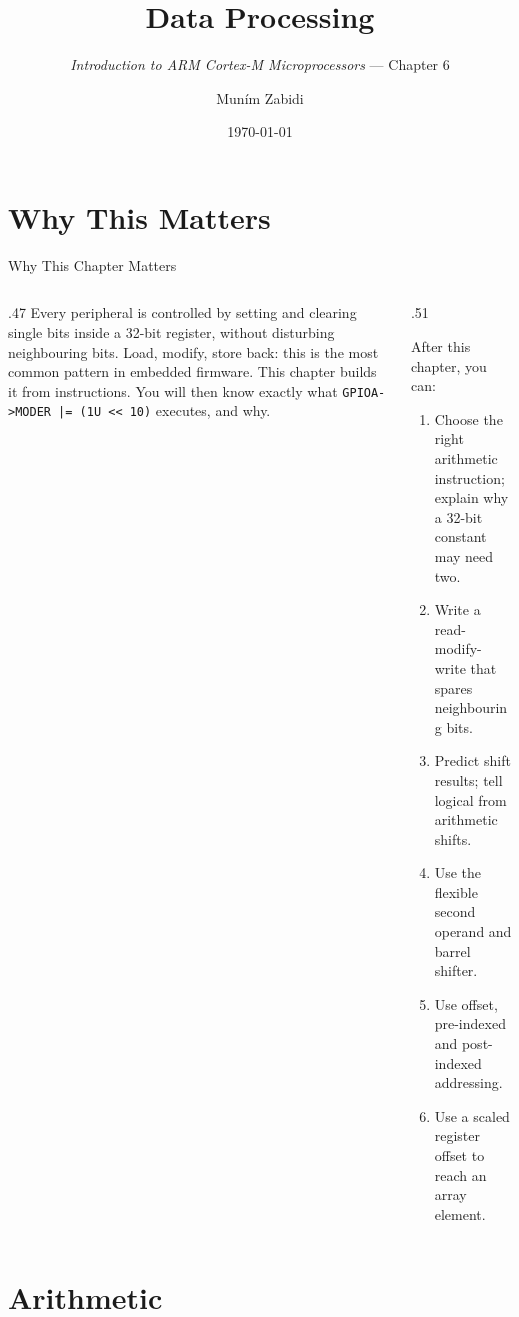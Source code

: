 \documentclass[9pt,aspectratio=169,xcolor=table]{beamer}
\title{Data Processing}
\subtitle{\emph{Introduction to ARM Cortex-M Microprocessors} --- Chapter 6}
\author{Mun\'{i}m Zabidi}
\institute{\color{primary}Faculty of Electrical Engineering, Universiti Teknologi Malaysia}
\date{\today}
\begin{document}
\titlepage

\section{Why This Matters}

\begin{frame}[fragile]{Why This Chapter Matters}
    \begin{columns}[T]
    \begin{column}{.47\textwidth}
        {\normalsize Every peripheral is controlled by setting and clearing single bits inside a 32-bit register, without disturbing neighbouring bits. Load, modify, store back: this is the most common pattern in embedded firmware. This chapter builds it from instructions. You will then know exactly what \verb+GPIOA->MODER |= (1U << 10)+ executes, and why.}
    \end{column}
    \begin{column}{.51\textwidth}
        \begin{block}{After this chapter, you can:}
        {\small
        \begin{enumerate}\itemsep2pt
            \item Choose the right arithmetic instruction; explain why a 32-bit constant may need two.
            \item Write a read-modify-write that spares neighbouring bits.
            \item Predict shift results; tell logical from arithmetic shifts.
            \item Use the flexible second operand and barrel shifter.
            \item Use offset, pre-indexed and post-indexed addressing.
            \item Use a scaled register offset to reach an array element.
        \end{enumerate}}
        \end{block}
    \end{column}
    \end{columns}
\end{frame}

\section{Arithmetic}
\end{document}
